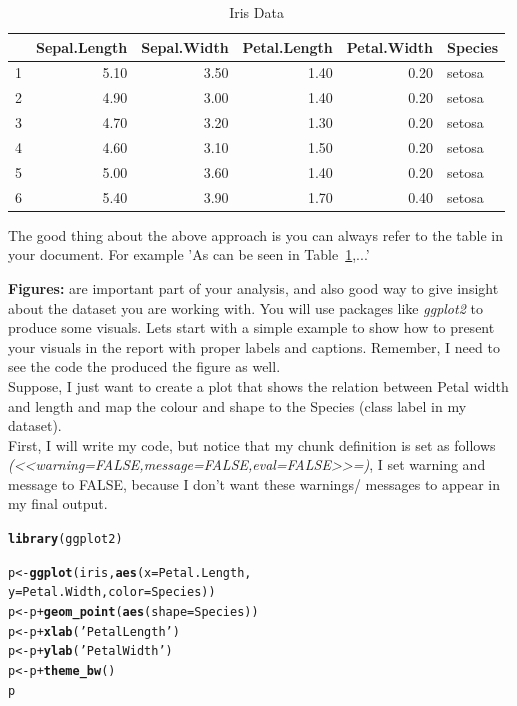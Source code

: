 \documentclass[10pt]{article}\usepackage[]{graphicx}\usepackage[]{color}
\makeatletter
\newcommand{\hlstr}[1]{\textcolor[rgb]{0.192,0.494,0.8}{#1}}%
\newcommand{\hlopt}[1]{\textcolor[rgb]{0,0,0}{#1}}%
\newcommand{\hlstd}[1]{\textcolor[rgb]{0.345,0.345,0.345}{#1}}%
\newcommand{\hlkwb}[1]{\textcolor[rgb]{0.69,0.353,0.396}{#1}}%
\newcommand{\hlkwc}[1]{\textcolor[rgb]{0.333,0.667,0.333}{#1}}%
\newcommand{\hlkwd}[1]{\textcolor[rgb]{0.737,0.353,0.396}{\textbf{#1}}}%
\newenvironment{kframe}{%
 \def\at@end@of@kframe{}%
 \ifinner\ifhmode%
  \def\at@end@of@kframe{\end{minipage}}%
  \begin{minipage}{\columnwidth}%
 \fi\fi%
 \def\FrameCommand##1{\hskip\@totalleftmargin \hskip-\fboxsep
 \colorbox{shadecolor}{##1}\hskip-\fboxsep
     \hskip-\linewidth \hskip-\@totalleftmargin \hskip\columnwidth}%
 \MakeFramed {\advance\hsize-\width
   \@totalleftmargin\z@ \linewidth\hsize
   \@setminipage}}%
 {\par\unskip\endMakeFramed%
 \at@end@of@kframe}
\newenvironment{knitrout}{}{} %
\makeatother
\begin{document}
\begin{table}[ht]
\centering
\caption{Iris Data}
\begin{tabular}{rrrrrl}
  \hline
 & Sepal.Length & Sepal.Width & Petal.Length & Petal.Width & Species \\ 
  \hline
1 & 5.10 & 3.50 & 1.40 & 0.20 & setosa \\ 
  2 & 4.90 & 3.00 & 1.40 & 0.20 & setosa \\ 
  3 & 4.70 & 3.20 & 1.30 & 0.20 & setosa \\ 
  4 & 4.60 & 3.10 & 1.50 & 0.20 & setosa \\ 
  5 & 5.00 & 3.60 & 1.40 & 0.20 & setosa \\ 
  6 & 5.40 & 3.90 & 1.70 & 0.40 & setosa \\ 
   \hline
\end{tabular}
\label{tab1}
\end{table}

The good thing about the above approach is you can always refer to the table in your document. For example 'As can be seen in Table~\ref{tab1},...'

\textbf{Figures:} are important part of your analysis, and also good way to give insight about the dataset you are working with. You will use packages like \textit{ggplot2} to produce some visuals. Lets start with a simple example to show how to present your visuals in the report with proper labels and captions. Remember, I need to see the code the produced the figure as well. \\

Suppose, I just want to create a plot that shows the relation between Petal width and length and map the colour and shape to the Species (class label in my dataset). \\

First, I will write my code, but notice that my chunk definition is set as follows\\ \textit{(<<warning=FALSE,message=FALSE,eval=FALSE>>=)}, I set warning and message to FALSE, because I don't want these warnings/ messages to appear in my final output. 


\begin{knitrout}
\color{fgcolor}\begin{kframe}
\begin{alltt}
\hlkwd{library}\hlstd{(ggplot2)}

\hlstd{p} \hlkwb{<-} \hlkwd{ggplot}\hlstd{(iris,} \hlkwd{aes}\hlstd{(}\hlkwc{x}\hlstd{=Petal.Length,}
                      \hlkwc{y} \hlstd{= Petal.Width,}\hlkwc{color}\hlstd{=Species) )}
\hlstd{p} \hlkwb{<-} \hlstd{p}\hlopt{+} \hlkwd{geom_point}\hlstd{(}\hlkwd{aes}\hlstd{(}\hlkwc{shape}\hlstd{=Species))}
\hlstd{p} \hlkwb{<-} \hlstd{p} \hlopt{+} \hlkwd{xlab}\hlstd{(}\hlstr{'Petal Length'}\hlstd{)}
\hlstd{p} \hlkwb{<-} \hlstd{p} \hlopt{+} \hlkwd{ylab}\hlstd{(}\hlstr{'Petal Width'}\hlstd{)}
\hlstd{p} \hlkwb{<-} \hlstd{p} \hlopt{+} \hlkwd{theme_bw}\hlstd{()}
\hlstd{p}
\end{alltt}
\end{kframe}
\end{knitrout}
\end{document}
